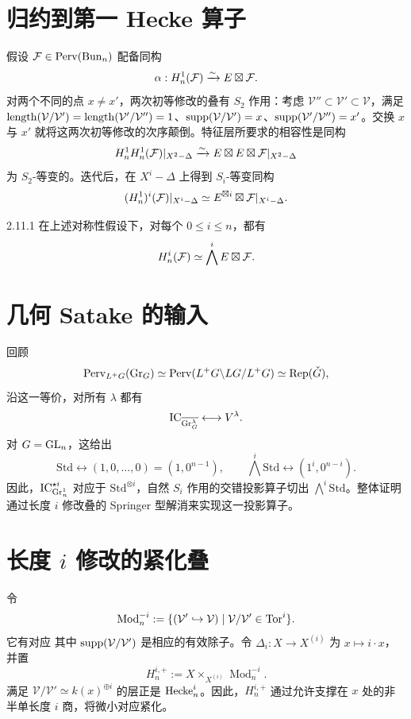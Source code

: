 \section{归约到第一 Hecke 算子}\label{sec:2.11}
假设 $\mathcal{F}\in\operatorname{Perv}(\operatorname{Bun}_n)$ 配备同构
\[\alpha:H_n^1(\mathcal{F})\xrightarrow{\sim}E\boxtimes\mathcal{F}.\]
对两个不同的点 $x\ne x'$，两次初等修改的叠有 $S_2$ 作用：考虑 $\mathcal V''\subset\mathcal V'\subset\mathcal V$，满足 $\operatorname{length}(\mathcal V/\mathcal V')=\operatorname{length}(\mathcal V'/\mathcal V'')=1$、$\operatorname{supp}(\mathcal V/\mathcal V')=x$、$\operatorname{supp}(\mathcal V'/\mathcal V'')=x'$。交换 $x$ 与 $x'$ 就将这两次初等修改的次序颠倒。特征层所要求的相容性是同构
\[H_n^1H_n^1(\mathcal{F})|_{X^2-\Delta}\xrightarrow{\sim}E\boxtimes E\boxtimes\mathcal{F}|_{X^2-\Delta}\]
为 $S_2$-等变的。迭代后，在 $X^i-\Delta$ 上得到 $S_i$-等变同构
\[(H_n^1)^i(\mathcal{F})|_{X^i-\Delta}\simeq E^{\boxtimes i}\boxtimes\mathcal{F}|_{X^i-\Delta}.\]
\begin{proposition}{}{2.11.1}
在上述对称性假设下，对每个 $0\le i\le n$，都有
\[H_n^i(\mathcal{F})\simeq\bigwedge^iE\boxtimes\mathcal{F}.\]
\end{proposition}
\section{几何 Satake 的输入}\label{sec:2.12}
回顾
\[\operatorname{Perv}_{L^+G}(\operatorname{Gr}_G)\simeq\operatorname{Perv}(L^+G\backslash LG/L^+G)\simeq\operatorname{Rep}(\check{G}),\]
沿这一等价，对所有 $\lambda$ 都有
\[\operatorname{IC}_{\overline{\operatorname{Gr}_G^\lambda}}\longleftrightarrow V^\lambda.\]
对 $G=\operatorname{GL}_n$，这给出
\[\mathrm{Std}\longleftrightarrow(1,0,\ldots,0)=(1,0^{n-1}),\qquad\bigwedge^i\mathrm{Std}\longleftrightarrow(1^i,0^{n-i}).\]
因此，$\operatorname{IC}_{\operatorname{Gr}_n^1}^{\star i}$ 对应于 $\mathrm{Std}^{\otimes i}$，自然 $S_i$ 作用的交错投影算子切出 $\bigwedge^i\mathrm{Std}$。整体证明通过长度 $i$ 修改叠的 Springer 型解消来实现这一投影算子。
\section{长度 \texorpdfstring{$i$}{i} 修改的紧化叠}\label{sec:2.13}
令
\[\operatorname{Mod}_n^{-i}:=\{(\mathcal V'\hookrightarrow\mathcal V)\mid\mathcal V/\mathcal V'\in\operatorname{Tor}^i\}.\]
它有对应
其中 $\operatorname{supp}(\mathcal V/\mathcal V')$ 是相应的有效除子。令 $\Delta_i:X\to X^{(i)}$ 为 $x\mapsto i\cdot x$，并置
\[H_n^{i,+}:=X\times_{X^{(i)}}\operatorname{Mod}_n^{-i}.\]
满足 $\mathcal V/\mathcal V'\simeq k(x)^{\oplus i}$ 的层正是 $\operatorname{Hecke}_n^i$。因此，$H_n^{i,+}$ 通过允许支撑在 $x$ 处的非半单长度 $i$ 商，将微小对应紧化。

